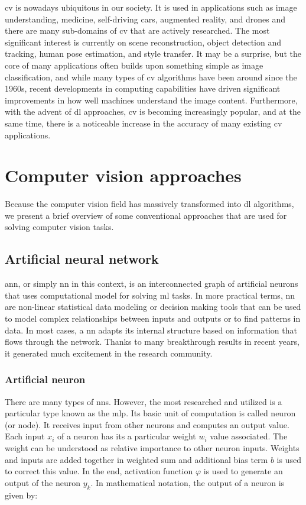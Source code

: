          \Gls{cv} is nowadays ubiquitous in our society. It is used in applications such as image understanding, medicine, self-driving cars, augmented reality, and drones and there are many sub-domains of \gls{cv} that are actively researched. The most significant interest is currently on scene reconstruction, object detection and tracking, human pose estimation, and style transfer. It may be a surprise, but the core of many applications often builds upon something simple as image classification, and while many types of \gls{cv} algorithms have been around since the 1960s, recent developments in computing capabilities have driven significant improvements in how well machines understand the image content. Furthermore, with the advent of \gls{dl} approaches, \gls{cv} is becoming increasingly popular, and at the same time, there is a noticeable increase in the accuracy of many existing \gls{cv} applications. 
     
\section{Computer vision approaches}
    Because the computer vision field has massively transformed into \gls{dl} algorithms, we present a brief overview of some conventional approaches that are used for solving computer vision tasks.
    
    \subsection{Artificial neural network}
        \Gls{ann}, or simply \gls{nn} in this context, is an interconnected graph of artificial neurons that uses computational model for solving \gls{ml} tasks. In more practical terms, \gls{nn} are non-linear statistical data modeling or decision making tools that can be used to model complex relationships between inputs and outputs or to find patterns in data. In most cases, a \gls{nn} adapts its internal structure based on information that flows through the network. Thanks to many breakthrough results in recent years, it generated much excitement in the research community. 
        
        \subsubsection{Artificial neuron}
            There are many types of \gls{nn}s. However, the most researched and utilized is a particular type known as the \gls{mlp}. Its basic unit of computation is called neuron (or node). It receives input from other neurons and computes an output value. Each input $x_i$ of a neuron has its a particular weight $w_i$ value associated. The weight can be understood as relative importance to other neuron inputs. Weights and inputs are added together in weighted sum and additional bias term $b$ is used to correct this value. In the end, activation function $\varphi$ is used to generate an output of the neuron $y_k$.  In mathematical notation, the output of a neuron is given by:
    
